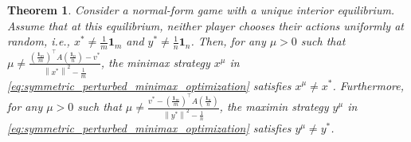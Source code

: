 \documentclass[10pt,a4paper]{amsart}
\newtheorem{theorem}{Theorem}
\newcommand{\bone}{\mathbf{1}}
\begin{document}
\begin{theorem}
    Consider a normal-form game with a unique interior equilibrium. Assume that at this equilibrium, neither player chooses their actions uniformly at random, i.e.,  $x^{\ast} \neq \frac{1}{m} \bone_m$ and $y^{\ast} \neq \frac{1}{n} \bone_n$.
    Then, for any $\mu > 0$ such that $\mu\neq \frac{\left(\frac{\bone_m}{m}\right)^{\top}A\left(\frac{\bone_n}{n}\right) - v^{\ast}}{\left\|x^{\ast}\right\|^2 - \frac{1}{m}}$, the minimax strategy $x^{\mu}$ in \eqref{eq:symmetric_perturbed_minimax_optimization} satisfies $x^{\mu} \neq x^{\ast}$.
    Furthermore, for any $\mu > 0$ such that $\mu \neq \frac{v^{\ast} - \left(\frac{\bone_m}{m}\right)^{\top}A\left(\frac{\bone_n}{n}\right)}{\left\|y^{\ast}\right\|^2 - \frac{1}{n}}$, the maximin strategy $y^{\mu}$ in \eqref{eq:symmetric_perturbed_minimax_optimization} satisfies $y^{\mu} \neq y^{\ast}$.
    \label{thm:suboptimality_of_equilibrium_in_symmetrically_perturbed_game}
\end{theorem}
\end{document}
